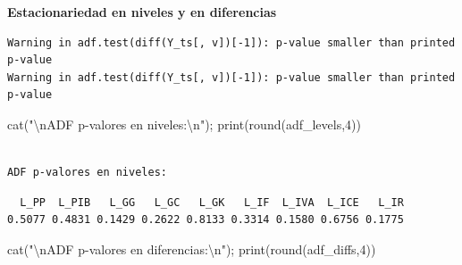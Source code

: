 \documentclass[
  spanish,
  letterpaper,
  DIV=11,
  numbers=noendperiod]{scrartcl}
\newenvironment{Shaded}{\begin{snugshade}}{\end{snugshade}}
\newcommand{\ControlFlowTok}[1]{\textcolor[rgb]{0.00,0.23,0.31}{\textbf{#1}}}
\newcommand{\DecValTok}[1]{\textcolor[rgb]{0.68,0.00,0.00}{#1}}
\newcommand{\FunctionTok}[1]{\textcolor[rgb]{0.28,0.35,0.67}{#1}}
\newcommand{\NormalTok}[1]{\textcolor[rgb]{0.00,0.23,0.31}{#1}}
\newcommand{\OtherTok}[1]{\textcolor[rgb]{0.00,0.23,0.31}{#1}}
\newcommand{\SpecialCharTok}[1]{\textcolor[rgb]{0.37,0.37,0.37}{#1}}
\newcommand{\StringTok}[1]{\textcolor[rgb]{0.13,0.47,0.30}{#1}}
\begin{document}
\textbf{Estacionariedad en niveles y en diferencias}

\begin{Shaded}
\end{Shaded}

\begin{verbatim}
Warning in adf.test(diff(Y_ts[, v])[-1]): p-value smaller than printed p-value
Warning in adf.test(diff(Y_ts[, v])[-1]): p-value smaller than printed p-value
\end{verbatim}

\begin{Shaded}
\begin{Highlighting}[]
\FunctionTok{cat}\NormalTok{(}\StringTok{"}\SpecialCharTok{\textbackslash{}n}\StringTok{ADF p{-}valores en niveles:}\SpecialCharTok{\textbackslash{}n}\StringTok{"}\NormalTok{); }\FunctionTok{print}\NormalTok{(}\FunctionTok{round}\NormalTok{(adf\_levels,}\DecValTok{4}\NormalTok{))}
\end{Highlighting}
\end{Shaded}

\begin{verbatim}

ADF p-valores en niveles:
\end{verbatim}

\begin{verbatim}
  L_PP  L_PIB   L_GG   L_GC   L_GK   L_IF  L_IVA  L_ICE   L_IR 
0.5077 0.4831 0.1429 0.2622 0.8133 0.3314 0.1580 0.6756 0.1775 
\end{verbatim}

\begin{Shaded}
\begin{Highlighting}[]
\FunctionTok{cat}\NormalTok{(}\StringTok{"}\SpecialCharTok{\textbackslash{}n}\StringTok{ADF p{-}valores en diferencias:}\SpecialCharTok{\textbackslash{}n}\StringTok{"}\NormalTok{); }\FunctionTok{print}\NormalTok{(}\FunctionTok{round}\NormalTok{(adf\_diffs,}\DecValTok{4}\NormalTok{))}
\end{Highlighting}
\end{Shaded}
\end{document}

